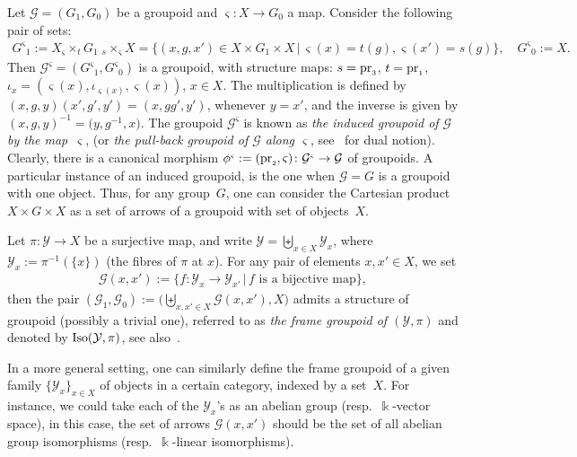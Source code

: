 \documentclass[10pt,a4paper]{amsart}
\numberwithin{equation}{section}
\newcommand{\Go}{\cG_{\Sscript{0}}}
\newcommand{\Ga}{\cG_{\Sscript{1}}}
\newcommand{\cG}{{\mathcal G}}
\newcommand{\cY}{{\mathcal Y}}
\newcommand{\Sscript}[1]{\scriptscriptstyle{#1}}
\newcommand{\due}[3]{{}_{{#2 }} {#1}_{{ #3}} }
\begin{document}
\begin{Example}\label{exam:induced}Let $\cG=(G_{\Sscript{1}}, G_{\Sscript{0}})$ be a groupoid and $\varsigma\colon X \to G_{\Sscript{0}}$ a map. Consider the following pair of sets:
\begin{gather*}
G^{\Sscript{\varsigma}}{}_{\Sscript{1}}:= X \due \times {\Sscript{\varsigma}} { \Sscript{t}} G_{\Sscript{1}} \; \due \times {\Sscript{s}} { \Sscript{\varsigma}} X= \big\{ (x,g,x')
\in X\times G_{\Sscript{1}}\times X\,| \, \varsigma(x)=t(g), \varsigma(x')=s(g) \big\}, \quad G^{\Sscript{\varsigma}}{}_{\Sscript{0}}:=X.
\end{gather*}
Then $\cG^{\Sscript{\varsigma}}{}=(G^{\Sscript{\varsigma}}{}_{\Sscript{1}}, G^{\Sscript{\varsigma}}{}_{\Sscript{0}})$ is a groupoid, with structure maps: $s= {\rm pr}_{\Sscript{3}}$, $t= {\rm pr}_{\Sscript{1}}$, $\iota_{\Sscript{x}}=(\varsigma(x), \iota_{\Sscript{\varsigma(x)}}, \varsigma(x))$, $x \in X$. The multiplication is defined by $(x,g,y) (x',g',y')= ( x,gg',y')$, whenever $y=x'$, and the inverse is given by $(x,g,y)^{-1}=\big(y,g^{-1},x\big)$. The groupoid $\cG^{\Sscript{\varsigma}}$ is known as \emph{the induced groupoid of $\cG$ by the map~$\varsigma$}, (or \emph{the
pull-back groupoid of $\cG$ along $\varsigma$}, see~\cite{Higgins:1971} for dual notion). Clearly, there is a canonical morphism $\phi^{\Sscript{\varsigma}}:=({\rm pr}_{\Sscript{2}},
\varsigma)\colon \cG^{\Sscript{\varsigma}} \to \cG$ of groupoids. A particular instance of an induced groupoid, is the one when $\cG=G$ is a groupoid with one object. Thus, for any group~$G$, one can consider the Cartesian product $X \times G \times X$ as a set of arrows of a groupoid with set of objects~$X$.
\end{Example}

\begin{Example}\label{exam:frame}Let $\pi\colon \cY \to X$ be a surjective map, and write $\cY =\biguplus_{\Sscript{ x \in X }} \cY_{\Sscript{x}}$, where $\cY_{\Sscript{x}}:=\pi^{-1}(\{x\})$ (the fibres of $\pi$ at $x$). For any pair of elements $x, x' \in X$, we set
\begin{gather*}
\cG(x,x'):=\big\{ f \colon \cY_{\Sscript{x}} \to \cY_{\Sscript{x'}}\,|\, f \text{ is a bijective map} \big\},
\end{gather*}
then the pair $(\Ga, \Go):=\big(\biguplus_{\Sscript{x, x' \in X}} \cG(x,x'), X\big)$ admits a structure of groupoid (possibly a trivial one), referred to as \emph{the frame groupoid of $(\cY, \pi)$} and denoted by ${\rm Iso}(\cY, \pi)$, see also~\cite{Renault:1980}.

In a more general setting, one can similarly define the frame groupoid of a given family $\{\cY_{\Sscript{x}}\}_{x \in X}$ of objects in a certain category, indexed by a set~$X$. For instance, we could take each of the $\cY_{\Sscript{x}}$'s as an abelian group (resp.~$\Bbbk$-vector space), in this case, the set of arrows $\cG(x,x')$ should be the set of all abelian group isomorphisms (resp.~$\Bbbk$-linear isomorphisms).
\end{Example}
\end{document}

